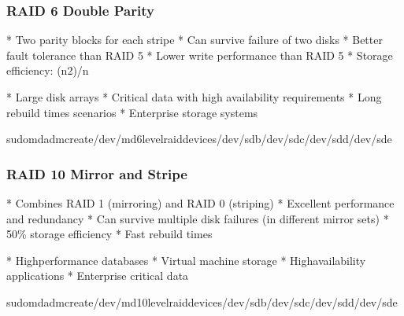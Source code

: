 \documentclass[letterpaper,10pt,english]{sphinxmanual}
\begin{document}
\subsubsection{RAID 6 \sphinxhyphen{} Double Parity}
\label{\detokenize{raid-systems:raid-6-double-parity}}
\sphinxAtStartPar
{}
* Two parity blocks for each stripe
* Can survive failure of two disks
* Better fault tolerance than RAID 5
* Lower write performance than RAID 5
* Storage efficiency: (n\sphinxhyphen{}2)/n

\sphinxAtStartPar
{}
* Large disk arrays
* Critical data with high availability requirements
* Long rebuild times scenarios
* Enterprise storage systems

\begin{sphinxVerbatim}[commandchars=\\\{\}]
sudomdadm\PYGZhy{}\PYGZhy{}create/dev/md6\PYGZhy{}\PYGZhy{}level\PYGZhy{}\PYGZhy{}raid\PYGZhy{}devices/dev/sdb/dev/sdc/dev/sdd/dev/sde
\end{sphinxVerbatim}


\subsubsection{RAID 10 \sphinxhyphen{} Mirror and Stripe}
\label{\detokenize{raid-systems:raid-10-mirror-and-stripe}}
\sphinxAtStartPar
{}
* Combines RAID 1 (mirroring) and RAID 0 (striping)
* Excellent performance and redundancy
* Can survive multiple disk failures (in different mirror sets)
* 50\% storage efficiency
* Fast rebuild times

\sphinxAtStartPar
{}
* High\sphinxhyphen{}performance databases
* Virtual machine storage
* High\sphinxhyphen{}availability applications
* Enterprise critical data

\begin{sphinxVerbatim}[commandchars=\\\{\}]
sudomdadm\PYGZhy{}\PYGZhy{}create/dev/md10\PYGZhy{}\PYGZhy{}level\PYGZhy{}\PYGZhy{}raid\PYGZhy{}devices/dev/sdb/dev/sdc/dev/sdd/dev/sde
\end{sphinxVerbatim}
\end{document}
